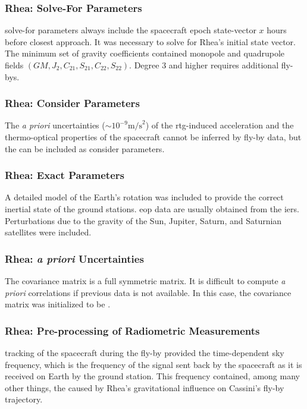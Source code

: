 \documentclass[oneside]{book}
\theoremstyle{mystyle}
\begin{document}
\subsubsection{\footnotesize Rhea: Solve-For Parameters}

\noindent \Gls{solve-for parameters} always include the spacecraft epoch state-vector $x$ hours before closest approach. It was necessary to solve for Rhea's initial state vector. The minimum set of gravity coefficients contained \gls{monopole} and \gls{quadrupole} fields $(GM, J_2, C_{21}, S_{21}, C_{22}, S_{22})$. Degree $3$ and higher requires additional fly-bys.

\subsubsection{\footnotesize Rhea: Consider Parameters}

The \textit{a priori} uncertainties ($\sim 10^{-9}\textrm{m/s}^2$) of the \gls{rtg}-induced acceleration and the thermo-optical properties of the spacecraft cannot be inferred by fly-by data, but the can be included as \gls{consider parameters}. 

\subsubsection{\footnotesize Rhea: Exact Parameters}

A detailed model of the Earth's rotation was included to provide the correct inertial state of the ground stations. \gls{eop} data are usually obtained from the \gls{iers}. Perturbations due to the gravity of the Sun, Jupiter, Saturn, and Saturnian satellites were included.

\subsubsection{\footnotesize Rhea: \textit{a priori} Uncertainties} 
The \gls{covariance matrix} is a full \gls{symmetric matrix}. It is difficult to compute \textit{a priori} correlations if previous data is not available. In this case, the covariance matrix was initialized to be .

\subsubsection{\footnotesize Rhea: Pre-processing of Radiometric Measurements}

 tracking of the spacecraft during the fly-by provided the time-dependent \gls{sky frequency}, which is the frequency of the signal sent back by the spacecraft as it is received on Earth by the ground station. This frequency contained, among many other things, the  caused by Rhea’s gravitational influence on Cassini’s fly-by trajectory.
\end{document}

